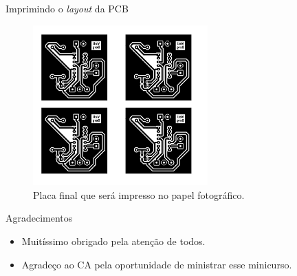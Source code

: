 \documentclass{beamer}
\begin{document}
\begin{frame}{Imprimindo o \textit{layout} da PCB}
	\begin{figure}
		\centering
		\includegraphics[width=0.6\textwidth]{Imagens/42_placa_final.png}
		\caption{Placa final que será impresso no papel fotográfico.}
	\end{figure}
\end{frame}

\begin{frame}{Agradecimentos}
	\begin{itemize}
		\item Muitíssimo obrigado pela atenção de todos.
		\item Agradeço ao CA pela oportunidade de ministrar esse minicurso.
	\end{itemize}
\end{frame}

\begin{frame}
	\titlepage
\end{frame}
\end{document}
